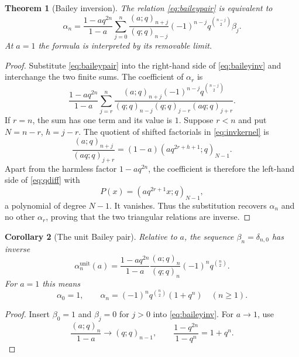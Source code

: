 \documentclass[11pt]{article}
\numberwithin{equation}{section}
\newtheorem{theorem}{Theorem}[section]
\newtheorem{corollary}[theorem]{Corollary}
\theoremstyle{definition}
\theoremstyle{remark}
\begin{document}
\begin{theorem}[Bailey inversion]\label{thm:baileyinv}
The relation \eqref{eq:baileypair} is equivalent to
\begin{equation}\label{eq:baileyinv}
\alpha_n=\frac{1-aq^{2n}}{1-a}
\sum_{j=0}^n
\frac{(a;q)_{n+j}}{(q;q)_{n-j}}
(-1)^{n-j}q^{\binom{n-j}{2}}\beta_j.
\end{equation}
At $a=1$ the formula is interpreted by its removable limit.
\end{theorem}
\begin{proof}
Substitute \eqref{eq:baileypair} into the right-hand side of
\eqref{eq:baileyinv} and interchange the two finite sums.  The coefficient of
$\alpha_r$ is
\begin{equation}\label{eq:invkernel}
\frac{1-aq^{2n}}{1-a}
\sum_{j=r}^n
\frac{(a;q)_{n+j}(-1)^{n-j}q^{\binom{n-j}{2}}}
{(q;q)_{n-j}(q;q)_{j-r}(aq;q)_{j+r}}.
\end{equation}
If $r=n$, the sum has one term and its value is $1$.  Suppose $r<n$ and put
$N=n-r$, $h=j-r$.  The quotient of shifted factorials in
\eqref{eq:invkernel} is
\[
\frac{(a;q)_{n+j}}{(aq;q)_{j+r}}
=(1-a)(aq^{2r+h+1};q)_{N-1}.
\]
Apart from the harmless factor $1-aq^{2n}$, the coefficient is therefore the
left-hand side of \eqref{eq:qdiff} with
\[
P(x)=(aq^{2r+1}x;q)_{N-1},
\]
a polynomial of degree $N-1$.  It vanishes.  Thus the substitution recovers
$\alpha_n$ and no other $\alpha_r$, proving that the two triangular
relations are inverse.
\end{proof}

\begin{corollary}[The unit Bailey pair]\label{cor:unitpair}
Relative to $a$, the sequence $\beta_n=\delta_{n,0}$ has inverse
\begin{equation}\label{eq:unitalpha}
\alpha_n^{\mathrm{unit}}(a)
=\frac{1-aq^{2n}}{1-a}\frac{(a;q)_n}{(q;q)_n}
(-1)^nq^{\binom n2}.
\end{equation}
For $a=1$ this means
\begin{equation}\label{eq:unit-a1}
\alpha_0=1,\qquad
\alpha_n=(-1)^nq^{\binom n2}(1+q^n)\quad(n\ge1).
\end{equation}
\end{corollary}
\begin{proof}
Insert $\beta_0=1$ and $\beta_j=0$ for $j>0$ into
\eqref{eq:baileyinv}.  For $a\to1$, use
\[
\frac{(a;q)_n}{1-a}\longrightarrow(q;q)_{n-1},\qquad
\frac{1-q^{2n}}{1-q^n}=1+q^n.
\]
\end{proof}
\end{document}
